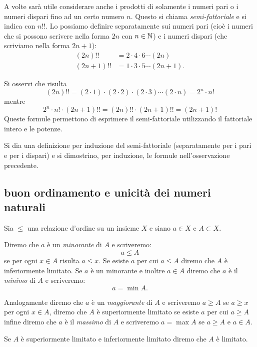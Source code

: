   A volte sarà utile considerare anche i prodotti di solamente i numeri
  pari o i numeri dispari fino ad un certo numero $n$. Questo
  si chiama \emph{semi-fattoriale}%
%
 e si indica con $n!!$. 
  Lo possiamo definire separatamente sui numeri pari (cioè 
  i numeri che si possono scrivere nella forma $2n$ con $n\in {\mathbb N}$)
  e i numeri dispari (che scriviamo nella forma $2n+1$):
  \begin{align*}
    (2n)!! &= 2 \cdot 4 \cdot 6 \cdots (2n) \\
    (2n+1)!! &= 1 \cdot 3 \cdot 5 \cdots (2n+1).
  \end{align*}
  
  \begin{remark}
  \label{rem:doppio_fattoriale}%
  Si osservi che risulta
  \[
    (2n)!! = (2\cdot 1) \cdot (2\cdot 2) \cdot (2\cdot 3) \cdots (2\cdot n)
          = 2^n \cdot n!
  \]
  mentre
  \[
    2^n \cdot n! \cdot (2n+1)!! 
    = (2n)!! \cdot (2n+1)!!
    = (2n+1)!
  \]
  Queste formule permettono di esprimere il semi-fattoriale utilizzando
  il fattoriale intero e le potenze.
  \end{remark}
  
\begin{exercise}
  Si dia una definizione per induzione del semi-fattoriale
  (separatamente per i pari e per i dispari)
  e si dimostrino, per induzione, le formule nell'osservazione precedente.
\end{exercise}

\subsection{buon ordinamento e unicità dei numeri naturali}

\begin{definition}
  \label{def:minorante}%
  \label{def:maggiorante}%
  \label{def:minimo}%
  \label{def:limitato}%
  Sia $\le$ una relazione d'ordine su un insieme $X$ e siano 
  $a\in X$ e $A\subset X$.

  Diremo che $a$ è un \emph{minorante}%
%
 di $A$ e scriveremo:
  \[
    a \le A
  \]
  se per ogni $x\in A$ risulta $a\le x$. 
  Se esiste $a$ per cui $a\le A$ diremo che $A$ 
  è inferiormente limitato.
  Se $a$ è un minorante e inoltre $a\in A$ diremo 
  che $a$ è il \emph{minimo}%
%
 di $A$ e scriveremo:
  \[
    a = \min A.  
  \] 

  Analogamente diremo che $a$ è un \emph{maggiorante}%
%
  di $A$ e scriveremo $a \ge A$ se $a\ge x$ per ogni $x\in A$,
  diremo che $A$ è superiormente limitato 
  se esiste $a$ per cui $a \ge A$ infine
  diremo che $a$ è il \emph{massimo}%
%
 di $A$ 
  e scriveremo $a=\max A$ se $a\ge A$ e $a\in A$.

  Se $A$ è superiormente limitato e inferiormente limitato
  diremo che $A$ è limitato.
\end{definition}

